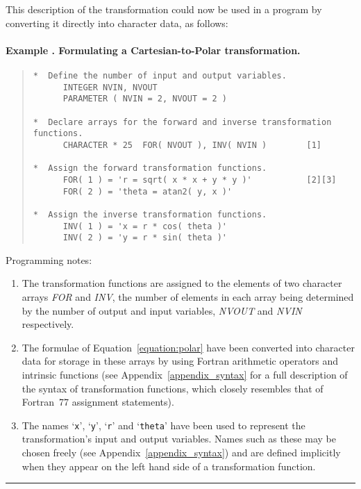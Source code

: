 \documentclass[twoside,11pt]{article}
\renewcommand{\_}{\texttt{\symbol{95}}}
\newcommand{\fortvar}[1]{\mbox{\emph{#1}}}
\newcounter{examplecounter}
\newcommand{\example}[1]{\addtocounter{examplecounter}{1}
                         \paragraph{\textbf{Example \theexamplecounter. #1}}}
\newcommand{\exampledone}[0]{\begin{center} \rule{6em}{0.2mm} \end{center}}
\begin{document}
This description of the transformation could now be used in a program by
converting it directly into character data, as follows:

\example{Formulating a Cartesian-to-Polar transformation.}
\begin{quote}
\begin{verbatim}
*  Define the number of input and output variables.
      INTEGER NVIN, NVOUT
      PARAMETER ( NVIN = 2, NVOUT = 2 )

*  Declare arrays for the forward and inverse transformation functions.
      CHARACTER * 25  FOR( NVOUT ), INV( NVIN )        [1]

*  Assign the forward transformation functions.
      FOR( 1 ) = 'r = sqrt( x * x + y * y )'           [2][3]
      FOR( 2 ) = 'theta = atan2( y, x )'

*  Assign the inverse transformation functions.
      INV( 1 ) = 'x = r * cos( theta )'
      INV( 2 ) = 'y = r * sin( theta )'

\end{verbatim}
\end{quote}

Programming notes:

\begin{enumerate}

\item  The transformation functions are assigned to the elements of two
character arrays \fortvar{FOR} and \fortvar{INV}, the number of elements in
each array being determined by the number of output and input variables,
\fortvar{NVOUT} and \fortvar{NVIN} respectively.

\item The formulae of Equation~\ref{equation:polar} have been converted into
character data for storage in these arrays by using Fortran arithmetic
operators and intrinsic functions (see Appendix~\ref{appendix_syntax} for a
full description of the syntax of transformation functions, which closely
resembles that of Fortran~77 assignment statements).

\item The names `\verb#x#', `\verb#y#', `\verb#r#' and `\verb#theta#' have
been used to represent the transformation's input and output variables.
Names such as these may be chosen freely (see
Appendix~\ref{appendix_syntax}) and are defined implicitly when they appear
on the left hand side of a transformation function.

\end{enumerate}
\exampledone
\end{document}
